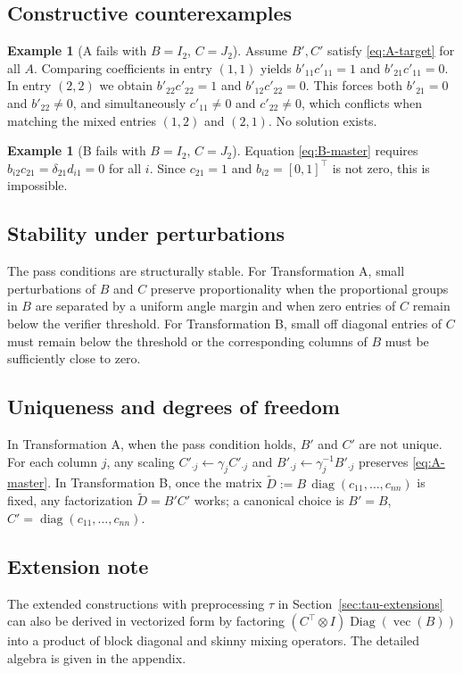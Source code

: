 \documentclass[11pt,a4paper]{article}
\theoremstyle{definition}
\newtheorem{example}[theorem]{Example}
\newcommand{\diag}{\operatorname{diag}}
\newcommand{\Diag}{\operatorname{Diag}}
\newcommand{\vecop}{\operatorname{vec}}
\begin{document}
\subsection{Constructive counterexamples}
\begin{example}[A fails with $B=I_2$, $C=J_2$]
Assume $B',C'$ satisfy \eqref{eq:A-target} for all $A$. Comparing coefficients in entry $(1,1)$ yields $b'_{1 1}c'_{1 1}=1$ and $b'_{2 1}c'_{1 1}=0$. In entry $(2,2)$ we obtain $b'_{2 2}c'_{2 2}=1$ and $b'_{1 2}c'_{2 2}=0$. This forces both $b'_{2 1}=0$ and $b'_{2 2}\ne 0$, and simultaneously $c'_{1 1}\ne 0$ and $c'_{2 2}\ne 0$, which conflicts when matching the mixed entries $(1,2)$ and $(2,1)$. No solution exists.
\end{example}

\begin{example}[B fails with $B=I_2$, $C=J_2$]
Equation \eqref{eq:B-master} requires $b_{i 2} c_{2 1}=\delta_{2 1} d_{i 1}=0$ for all $i$. Since $c_{2 1}=1$ and $b_{i 2}=[0,1]^\top$ is not zero, this is impossible.
\end{example}

\subsection{Stability under perturbations}
The pass conditions are structurally stable. For Transformation A, small perturbations of $B$ and $C$ preserve proportionality when the proportional groups in $B$ are separated by a uniform angle margin and when zero entries of $C$ remain below the verifier threshold. For Transformation B, small off diagonal entries of $C$ must remain below the threshold or the corresponding columns of $B$ must be sufficiently close to zero.

\subsection{Uniqueness and degrees of freedom}
In Transformation A, when the pass condition holds, $B'$ and $C'$ are not unique. For each column $j$, any scaling $C'_{\cdot j}\leftarrow \gamma_j C'_{\cdot j}$ and $B'_{\cdot j}\leftarrow \gamma_j^{-1} B'_{\cdot j}$ preserves \eqref{eq:A-master}. In Transformation B, once the matrix $\tilde D := B\,\diag(c_{11},\dots,c_{n n})$ is fixed, any factorization $\tilde D = B' C'$ works; a canonical choice is $B'=B$, $C'=\diag(c_{11},\dots,c_{n n})$.


\subsection{Extension note}
The extended constructions with preprocessing $\tau$ in Section~\ref{sec:tau-extensions} can also be derived in vectorized form by factoring $(C^\top\!\otimes I)\Diag(\vecop(B))$ into a product of block diagonal and skinny mixing operators. The detailed algebra is given in the appendix.
\end{document}
